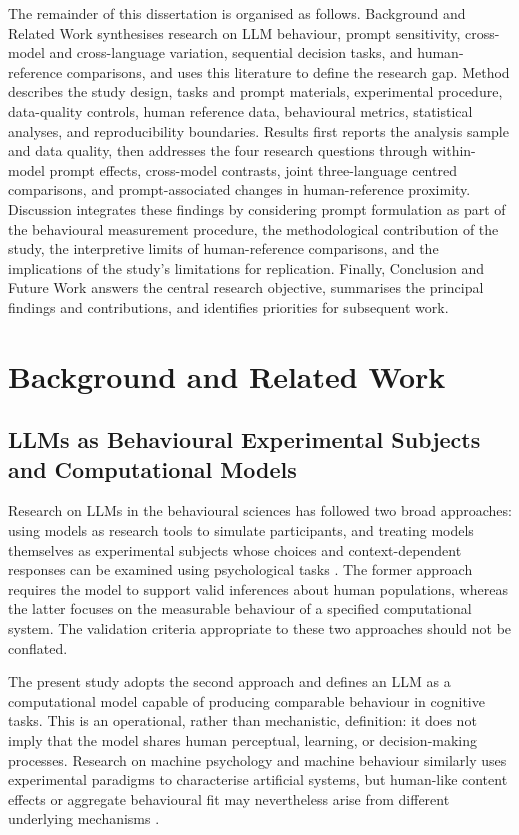 \documentclass[logo,msc]{infthesis}
\begin{document}
The remainder of this dissertation is organised as follows. Background and Related Work synthesises research on LLM behaviour, prompt sensitivity, cross-model and cross-language variation, sequential decision tasks, and human-reference comparisons, and uses this literature to define the research gap. Method describes the study design, tasks and prompt materials, experimental procedure, data-quality controls, human reference data, behavioural metrics, statistical analyses, and reproducibility boundaries. Results first reports the analysis sample and data quality, then addresses the four research questions through within-model prompt effects, cross-model contrasts, joint three-language centred comparisons, and prompt-associated changes in human-reference proximity. Discussion integrates these findings by considering prompt formulation as part of the behavioural measurement procedure, the methodological contribution of the study, the interpretive limits of human-reference comparisons, and the implications of the study's limitations for replication. Finally, Conclusion and Future Work answers the central research objective, summarises the principal findings and contributions, and identifies priorities for subsequent work.
\chapter{Background and Related Work}

\section{LLMs as Behavioural Experimental Subjects and Computational Models}

Research on LLMs in the behavioural sciences has followed two broad approaches: using models as research tools to simulate participants, and treating models themselves as experimental subjects whose choices and context-dependent responses can be examined using psychological tasks \cite{Dillion2023ReplaceParticipants,Hagendorff2023MachinePsychology,Rahwan2019MachineBehaviour}. The former approach requires the model to support valid inferences about human populations, whereas the latter focuses on the measurable behaviour of a specified computational system. The validation criteria appropriate to these two approaches should not be conflated.

The present study adopts the second approach and defines an LLM as a computational model capable of producing comparable behaviour in cognitive tasks. This is an operational, rather than mechanistic, definition: it does not imply that the model shares human perceptual, learning, or decision-making processes. Research on machine psychology and machine behaviour similarly uses experimental paradigms to characterise artificial systems, but human-like content effects or aggregate behavioural fit may nevertheless arise from different underlying mechanisms \cite{Rahwan2019MachineBehaviour,Lampinen2024ContentEffects,Lin2025SixFallacies}.
\end{document}
